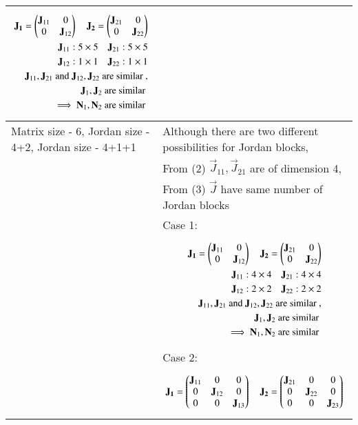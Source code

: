 \documentclass[journal,12pt]{IEEEtran}
\begin{document}
\begin{longtable}{|p{5cm}|p{13cm}|}
{\begin{align*}
    \mathbf{J_1}=\begin{pmatrix}\mathbf{J}_{11} & 0 \\ 0&\mathbf{J}_{12}\end{pmatrix} \quad \mathbf{J_2}=\begin{pmatrix}\mathbf{J}_{21} & 0 \\ 0&\mathbf{J}_{22}\end{pmatrix}\\
    \mathbf{J}_{11}: 5\times5 \quad \mathbf{J}_{21}: 5\times5\\
    \mathbf{J}_{12}: 1\times1 \quad \mathbf{J}_{22}: 1\times1\\
    \mathbf{J}_{11}, \mathbf{J}_{21} \text{ and } \mathbf{J}_{12}, \mathbf{J}_{22} \text{ are similar }, \\
    \mathbf{J}_{1}, \mathbf{J}_{2} \text{ are similar }\\
    \implies \mathbf{N}_{1}, \mathbf{N}_{2} \text{ are similar }
\end{align*}}\\
\hline
Matrix size - 6, Jordan size - 4+2, Jordan size - 4+1+1 & Although there are two different possibilities for Jordan blocks,\\& From (2) $\vec{J}_{11}, \vec{J}_{21} $ are of dimension 4, \\& From (3) $\vec{J}$ have same number of Jordan blocks
\\& Case 1: 
\\&
\parbox{12cm}{\begin{align*}
    \mathbf{J_1}=\begin{pmatrix}\mathbf{J}_{11} & 0 \\ 0&\mathbf{J}_{12}\end{pmatrix} \quad \mathbf{J_2}=\begin{pmatrix}\mathbf{J}_{21} & 0 \\ 0&\mathbf{J}_{22}\end{pmatrix}\\
    \mathbf{J}_{11}: 4\times4 \quad \mathbf{J}_{21}: 4\times4\\
    \mathbf{J}_{12}: 2\times2 \quad \mathbf{J}_{22}: 2\times2\\
    \mathbf{J}_{11}, \mathbf{J}_{21} \text{ and } \mathbf{J}_{12}, \mathbf{J}_{22} \text{ are similar }, \\
    \mathbf{J}_{1}, \mathbf{J}_{2} \text{ are similar }\\
    \implies \mathbf{N}_{1}, \mathbf{N}_{2} \text{ are similar }
\end{align*}}
\\& Case 2: 
\\&
\parbox{12cm}{\begin{align*}
    \vec{J_1}=\myvec{\vec{J}_{11} & 0&0 \\ 0&\vec{J}_{12}&0\\0&0&\vec{J}_{13}} \quad \vec{J_2}=\myvec{\vec{J}_{21} & 0&0 \\ 0&\vec{J}_{22}&0\\0&0&\vec{J}_{23}}\\

\end{align*}}
\end{longtable}
\end{document}
